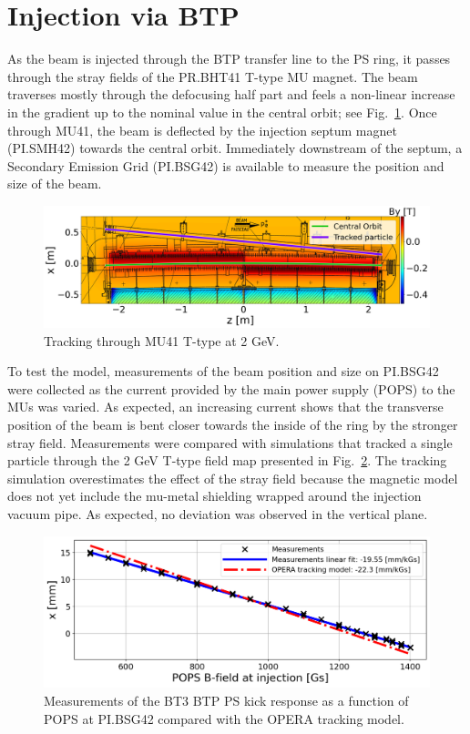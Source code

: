 \documentclass[a4paper,
               biblatex,     %
               keeplastbox,   %
               ]{jacow}
\begin{document}
\section{Injection via BTP}
As the beam is injected through the BTP transfer line to the PS ring, it passes through the stray fields of the PR.BHT41 T-type MU magnet. The beam traverses mostly through the defocusing half part and feels a non-linear increase in the gradient up to the nominal value in the central orbit; see Fig.~\ref{fig:injection_btp}. Once through MU41, the beam is deflected by the injection septum magnet (PI.SMH42) towards the central orbit. Immediately downstream of the septum, a Secondary Emission Grid (PI.BSG42) is available to measure the position and size of the beam.

\begin{figure}[!htb]
   \centering
   \includegraphics*[width=1.0\columnwidth]{MOPOTK030_f5.png}
   \caption{Tracking through MU41 T-type at 2 GeV.}
   \label{fig:injection_btp}
\end{figure}

To test the model, measurements of the beam position and size on PI.BSG42 were collected as the current provided by the main power supply (POPS) to the MUs was varied. As expected, an increasing current shows that the transverse position of the beam is bent closer towards the inside of the ring by the stronger stray field. Measurements were compared with simulations that tracked a single particle through the 2 GeV T-type field map presented in Fig.~\ref{fig:injection_btp_transverse_position}. The tracking simulation overestimates the effect of the stray field because the magnetic model does not yet include the mu-metal shielding wrapped around the injection vacuum pipe. As expected, no deviation was observed in the vertical plane.

\begin{figure}[!htb]
   \centering
   \includegraphics*[width=1.0\columnwidth]{transverse_position_vs_POPS.png}
   \caption{Measurements of the BT3 BTP PS kick response as a function of POPS at PI.BSG42 compared with the OPERA tracking model.}
   \label{fig:injection_btp_transverse_position}
\end{figure}
\end{document}
